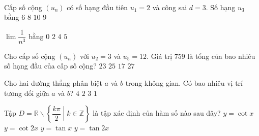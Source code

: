 ﻿﻿﻿﻿﻿﻿\begin{name}
	{\tenchude}
	{\tendethi}
	{\tentruong}
	{\thoigian}
\end{name}
\setcounter{ex}{0}\setcounter{bt}{0}
\begin{ex}%
	Cấp số cộng $(u_n)$ có số hạng đầu tiên $u_1=2$ và công sai $d=3$. Số hạng $u_3$ bằng
	\choice
	{$6$}
	{\True $8$}
	{$10$}
	{$9$}
\end{ex}

\begin{ex}%
	$\lim\dfrac{1}{n^3}$ bằng
	\choice
	{\True $0$}
	{$2$}
	{$4$}
	{$5$}
\end{ex}

\begin{ex}%
	Cho cấp số cộng $(u_n)$ với $u_2=3$ và $u_5=12$. Giá trị $759$ là tổng của bao nhiêu số hạng đầu của cấp số cộng?
	\choice
	{\True $23$}
	{$25$}
	{$17$}
	{$27$}
\end{ex}

\begin{ex}%
	Cho hai đường thẳng phân biệt $a$ và $b$ trong không gian. Có bao nhiêu vị trí tương đối giữa $a$ và $b$?
	\choice
	{$4$}
	{$2$}
	{\True $3$}
	{$1$}
\end{ex}

\begin{ex}%
	Tập $D=\mathbb{R}\backslash \left\{ \dfrac{k\pi }{2}\middle| k\in \mathbb{Z} \right\}$ là tập xác định của hàm số nào sau đây?
	\choice
	{ $y=\cot x$}
	{\True  $y=\cot 2x$}
	{ $y=\tan x$}
	{ $y=\tan 2x$}
\end{ex}

